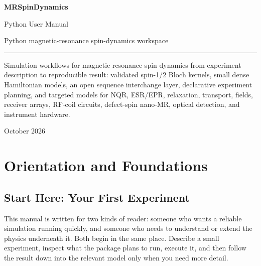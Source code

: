 \documentclass[11pt,oneside]{report}
\begin{document}
\begin{titlepage}
\pagecolor{Soft}
\color{Ink}
\vspace*{0.55in}
\begin{center}
\MRSpinDynamicsLogo[0.85]
\end{center}
\vspace{0.45in}
{\Huge\bfseries MRSpinDynamics\par}
\vspace{0.25in}
{\Large Python User Manual\par}
\vspace{0.15in}
{\large Python magnetic-resonance spin-dynamics workspace\par}
\vspace{0.45in}
{\color{Accent}\rule{0.82\linewidth}{3pt}\par}
\vspace{0.35in}
\begin{minipage}{0.78\linewidth}
\large
Simulation workflows for magnetic-resonance spin dynamics from experiment
description to reproducible result: validated spin-1/2 Bloch kernels, small
dense Hamiltonian models, an open sequence interchange layer, declarative
experiment planning, and targeted models for NQR, ESR/EPR, relaxation,
transport, fields, receiver arrays, RF-coil circuits, defect-spin nano-MR,
optical detection, and instrument hardware.
\end{minipage}
\vfill
{\large October 2026\par}
\end{titlepage}
\nopagecolor
\clearpage
{}
\tableofcontents
\clearpage
{}

\part{Orientation and Foundations}
\label{part:foundations}

\chapter{Start Here: Your First Experiment}
\label{chap:start}

This manual is written for two kinds of reader: someone who wants a reliable
simulation running quickly, and someone who needs to understand or extend the
physics underneath it. Both begin in the same place. Describe a small
experiment, inspect what the package plans to run, execute it, and then follow
the result down into the relevant model only when you need more detail.
\end{document}
